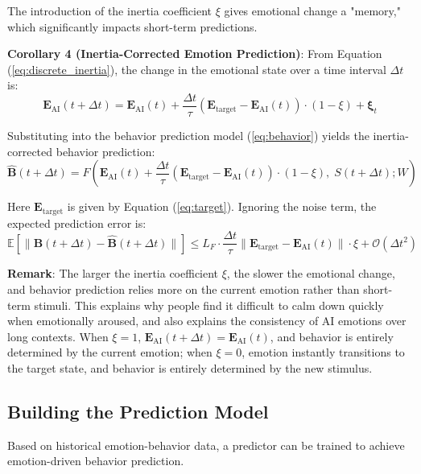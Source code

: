 \documentclass[12pt,a4paper]{article}
\theoremstyle{plain}
\newcommand{\ve}[1]{\bm{#1}}                    %
\newcommand{\Evec}{\ve{E}}                        %
\newcommand{\Bvec}{\ve{B}}                        %
\begin{document}
The introduction of the inertia coefficient $\xi$ gives emotional change a "memory," which significantly impacts short-term predictions.

\textbf{Corollary 4 (Inertia-Corrected Emotion Prediction)}: From Equation (\ref{eq:discrete_inertia}), the change in the emotional state over a time interval $\Delta t$ is:
\begin{equation}
\Evec_{\text{AI}}(t+\Delta t) = \Evec_{\text{AI}}(t) + \frac{\Delta t}{\tau} (\Evec_{\text{target}} - \Evec_{\text{AI}}(t)) \cdot (1 - \xi) + \boldsymbol{\xi}_t
\label{eq:inertia_prediction}
\end{equation}

Substituting into the behavior prediction model (\ref{eq:behavior}) yields the inertia-corrected behavior prediction:
\begin{equation}
\hat{\Bvec}(t+\Delta t) = F\left( \Evec_{\text{AI}}(t) + \frac{\Delta t}{\tau} (\Evec_{\text{target}} - \Evec_{\text{AI}}(t)) \cdot (1 - \xi), \; S(t+\Delta t); W \right)
\label{eq:inertia_behavior}
\end{equation}

Here $\Evec_{\text{target}}$ is given by Equation (\ref{eq:target}). Ignoring the noise term, the expected prediction error is:
\begin{equation}
\mathbb{E}[\| \Bvec(t+\Delta t) - \hat{\Bvec}(t+\Delta t) \|] \leq L_F \cdot \frac{\Delta t}{\tau} \| \Evec_{\text{target}} - \Evec_{\text{AI}}(t) \| \cdot \xi + \mathcal{O}(\Delta t^2)
\end{equation}

\textbf{Remark}: The larger the inertia coefficient $\xi$, the slower the emotional change, and behavior prediction relies more on the current emotion rather than short-term stimuli. This explains why people find it difficult to calm down quickly when emotionally aroused, and also explains the consistency of AI emotions over long contexts. When $\xi=1$, $\Evec_{\text{AI}}(t+\Delta t) = \Evec_{\text{AI}}(t)$, and behavior is entirely determined by the current emotion; when $\xi=0$, emotion instantly transitions to the target state, and behavior is entirely determined by the new stimulus.

\subsection{Building the Prediction Model}

Based on historical emotion-behavior data, a predictor can be trained to achieve emotion-driven behavior prediction.
\end{document}
